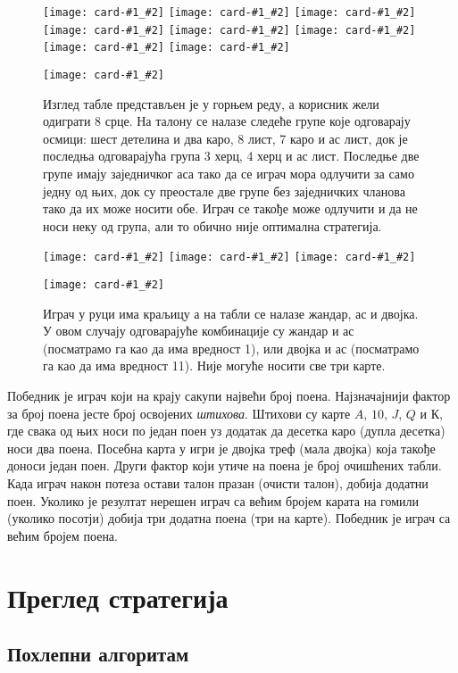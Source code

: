 \documentclass[a4paper, 12pt, ngerman]{article}
\let\oldsection\section
\renewcommand\section{\clearpage\oldsection}
\let\oldsubsection\subsection
\renewcommand\subsection{\clearpage\oldsubsection}
\newcommand{\quotesrb}[1]{\glqq#1\grqq}
\newcommand{\card}[2]{\texttt{[image: card-\#1\_\#2]}}
\begin{document}
\begin{figure}[htbp]
	\centering
	\card{6}{club}
	\card{2}{diamond}
	\card{jack}{club}
	\card{8}{spade}
	\card{3}{heart}
	\card{7}{diamond}
	\card{4}{heart}
	\card{1}{spade}
	
	\card{8}{heart}
	\caption{Изглед табле представљен је у горњем реду, а корисник жели одиграти 8 срце. На талону се налазе следеће групе које одговарају осмици: шест детелина и два каро, 8 лист, 7 каро и ас лист, док је последња одговарајућа група 3 херц, 4 херц и ас лист. Последње две групе имају заједничког аса тако да се играч мора одлучити за само једну од њих, док су преостале две групе без заједничких чланова тако да их може носити обе. Играч се такође може одлучити и да не носи неку од група, али то обично није оптимална стратегија.}
\end{figure}


\begin{figure}[htbp]
	\centering
	\card{jack}{heart}
	\card{1}{spade}
	\card{2}{club}
		
	\card{queen}{heart}
	\caption{Играч у руци има краљицу а на табли се налазе жандар, ас и двојка. У овом случају одговарајуће комбинације су жандар и ас (посматрамо га као да има вредност 1), или двојка и ас (посматрамо га као да има вредност 11). Није могуће носити све три карте.}
\end{figure}


Победник је играч који на крају сакупи највећи број поена. Најзначајнији фактор за број поена јесте број освојених \textit{штихова}. Штихови су карте $A$, $10$, $J$, $Q$ и $К$, где свака од њих носи по један поен уз додатак да десетка каро (дупла десетка) носи два поена. Посебна карта у игри је двојка треф (мала двојка) која такође доноси један поен. Други фактор који утиче на поена је број \quotesrb{очишћених} табли. Када играч након потеза остави талон празан (очисти талон), добија додатни поен. Уколико је резултат нерешен играч са већим бројем карата на гомили (уколико посотји) добија три додатна поена (три на карте). Победник је играч са већим бројем поена.

\section{Преглед стратегија}

\subsection{Похлепни алгоритам}
\end{document}
